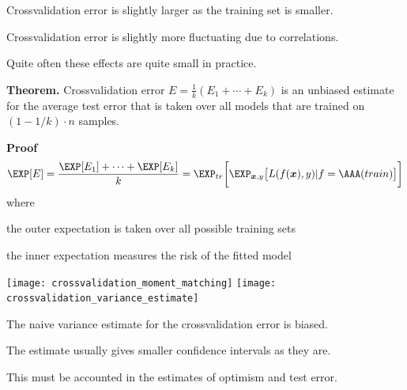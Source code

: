 \documentclass[landscape,footrule]{foils}
\renewcommand{\vec}[1]{\boldsymbol{#1}}
\begin{document}

\vspace*{-.5cm}
\begin{triangles}
\item Crossvalidation error is slightly larger as the training set is smaller.  
\item Crossvalidation error is slightly more fluctuating due to correlations. 
\item Quite often these effects are quite small in practice. 
\end{triangles}




\textbf{Theorem.} 
Crossvalidation error $E =\frac{1}{k}(E_1+\cdots+E_k)$ is an 
unbiased estimate for the average test error that is taken over all models that are trained on $(1-1/k)\cdot n$ samples. 

\textbf{Proof}
\begin{align*}
\EXP[E] =\frac{\EXP[E_1]+\cdots+\EXP[E_k]}{k}=\EXP_{tr}\biggl[\EXP_{\vec{x}, y}\bigl[L(f(\vec{x}),y)|f=\AAA(train)\bigr]\biggr]
\end{align*}
where 
\begin{triangles}
\item the outer expectation is taken over all possible training sets  
\item the inner expectation measures the risk of the fitted model
\end{triangles}



\centerline{
\texttt{[image: crossvalidation\_moment\_matching]}\hspace*{0.5cm}
\texttt{[image: crossvalidation\_variance\_estimate]}}
\vspace*{-.5cm}
\begin{triangles}
\item The naive variance estimate for the crossvalidation error is biased.   
\item The estimate usually gives smaller confidence intervals as they are.  
\item This must be accounted in the estimates of optimism and test error. 
\end{triangles}



\end{document}
